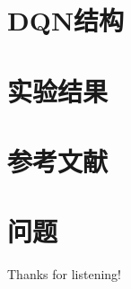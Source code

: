 \documentclass[aspectratio=169]{beamer}
\begin{document}


\section{DQN结构}

\section{实验结果}

\section{参考文献}

\section{问题}

\begin{frame}

    \centering
    \Huge
    Thanks for listening!

\end{frame}
\end{document}
